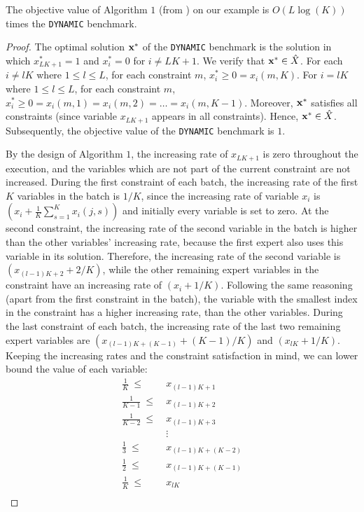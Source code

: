 \begin{claim}
The objective value of Algorithm $1$ (from \cite{AnandGe22:Online-Algorithms}) on our example is $O(L \log(K))$ times the \texttt{DYNAMIC} benchmark.
\end{claim}
%
\begin{proof}
The optimal solution $\mathbf{x}^{*}$ of the \texttt{DYNAMIC} benchmark is the solution in which $x^{*}_{LK+1} = 1$ and $x^{*}_{i} = 0$ for $i \neq LK + 1$.
We verify that $\mathbf{x}^{*} \in \hat{X}$. For each $i \neq l K$ where $1 \leq l \leq L$, for each constraint $m$, $x^{*}_{i} \geq 0 = x_{i}(m,K)$.
For $i = l K$  where $1 \leq l \leq L$, for each constraint $m$, $x^{*}_{i} \geq 0 = x_{i}(m,1) = x_{i}(m,2) = \ldots = x_{i}(m,K-1)$.
Moreover, $\mathbf{x}^{*}$ satisfies all constraints (since variable $x_{LK+1}$ appears in all constraints).
Hence, $\mathbf{x}^{*} \in \hat{X}$. Subsequently, the objective value of the \texttt{DYNAMIC} benchmark is $1$.

     By the design of Algorithm $1$, the increasing rate of $x_{LK+1}$ is zero throughout the execution, and the variables which are not part of the current constraint are not increased. During the first constraint of each batch, the increasing rate of the first $K$ variables in the batch is $1/K$, since the increasing rate of variable $x_i$ is $(x_i + \frac{1}{K} \sum_{s=1}^{K} x_i(j,s))$ and initially every variable is set to zero. At the second constraint, the increasing rate of the second variable in the batch is higher than the other variables' increasing rate, because the first expert also uses this variable in its solution. Therefore, the increasing rate of the second variable is $(x_{(l-1) K + 2} + 2/K)$, while the other remaining expert variables in the constraint have an increasing rate of $(x_i + 1/K)$. Following the same reasoning (apart from the first constraint in the batch), the variable with the smallest index in the constraint has a higher increasing rate, than the other variables. During the last constraint of each batch, the increasing rate of the last two remaining expert variables are
     $(x_{(l-1) K + (K-1)} + (K-1)/K)$ and $(x_{lK} + 1/K)$. Keeping the increasing rates and the constraint satisfaction in mind, we can lower bound the value of each variable:
     \begin{align*}
          \frac{1}{K} \ \le& \ x_{(l-1) K + 1} \\
          \frac{1}{K-1} \ \le& \ x_{(l-1) K + 2} \\
          \frac{1}{K-2} \ \le& \ x_{(l-1) K + 3} \\
          & \ \vdots \\
          \frac{1}{3} \ \le& \ x_{(l-1) K + (K-2)} \\
          \frac{1}{2} \ \le& \ x_{(l-1) K + (K-1)} \\
          \frac{1}{K} \ \le& \ x_{lK} \\
     \end{align*}


\end{proof}
